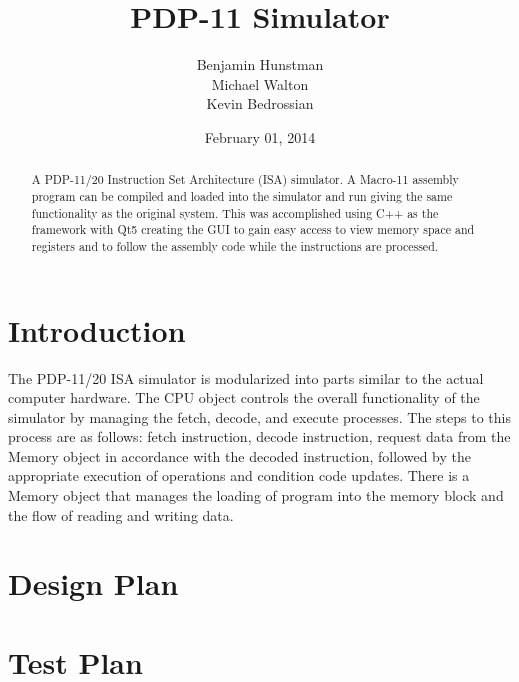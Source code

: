 \documentclass[]{report}   %
\begin{document}
\raggedright{}  %

\title{PDP-11 Simulator}   %
\author{Benjamin Hunstman \\
Michael Walton\\
Kevin Bedrossian}         %
\date{February 01, 2014}    %
\maketitle

\begin{abstract}
  A PDP-11/20 Instruction Set Architecture (ISA) simulator.  A Macro-11 assembly program can be compiled and loaded into the simulator and run giving the same functionality as the original system.  This was accomplished using C++ as the framework with Qt5 creating the GUI to gain easy access to view memory space and registers and to follow the assembly code while the instructions are processed.
\end{abstract}

\tableofcontents

\chapter{Introduction}
 The PDP-11/20 ISA simulator is modularized into parts similar to the actual computer hardware.  The CPU object controls the overall functionality of the simulator by managing the fetch, decode, and execute processes.  The steps to this process are as follows: fetch instruction, decode instruction, request data from the Memory object in accordance with the decoded instruction, followed by the appropriate execution of operations and condition code updates.  There is a Memory object that manages the loading of program into the memory block and the flow of reading and writing data. 

\chapter{Design Plan}


\chapter{Test Plan}

\end{document}

